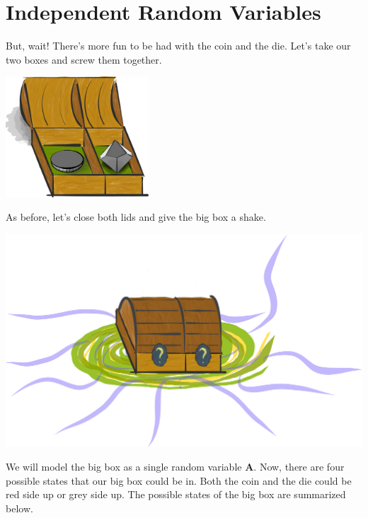 \section{Independent Random Variables}

But, wait!
There's more fun to be had with the coin and the die.
Let's take our two boxes and screw them together.
\begin{center}
\includegraphics[width=0.4\textwidth]{img/box-both-open-coin-die}
\end{center}
As before, let's close both lids and give the big box a shake.
\begin{center}
\includegraphics[width=\textwidth]{img/both-box-closed-portal}
\end{center}
We will model the big box as a single random variable $\bm{A}$.
Now, there are four possible states that our big box could be in.
Both the coin and the die could be red side up or grey side up.
The possible states of the big box are summarized below.
